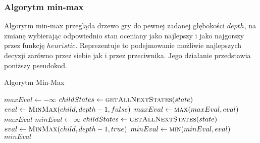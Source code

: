 \documentclass{article}
\begin{document}
	\subsubsection{Algorytm min-max}
	Algorytm min-max przegląda drzewo gry do pewnej zadanej głębokości $depth$, na zmianę wybierając odpowiednio stan oceniany jako najlepszy i jako najgorszy przez funkcję $heuristic$. Reprezentuje to podejmowanie możliwie najlepszych decyzji zarówno przez siebie jak i przez przeciwnika. Jego działanie przedstawia poniższy pseudokod.
	\begin{algorithm}[H]
		\caption{Algorytm Min-Max}
		\label{alg:minmax}
		\begin{algorithmic}[1]
					\State \Return {}
				\EndIf
					\State $maxEval \gets -\infty$
					\State $childStates \gets \Call{getAllNextStates}{state}$
						\State $eval \gets \Call{MinMax}{child, depth-1, false}$
						\State $maxEval \gets \Call{max}{maxEval, eval}$
					\EndFor
					\State \Return $maxEval$
				\Else
					\State $minEval \gets \infty$
					\State $childStates \gets \Call{getAllNextStates}{state}$
						\State $eval \gets \Call{MinMax}{child, depth-1, true}$
						\State $minEval \gets \Call{min}{minEval, eval}$
					\EndFor
					\State \Return $minEval$
				\EndIf
			\EndFunction
		\end{algorithmic}
	\end{algorithm}
\end{document}
